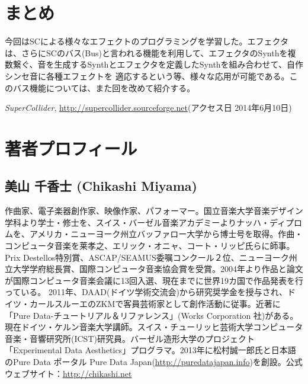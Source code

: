\documentclass{jsarticle}
\begin{document}
\section{まとめ}
今回はSCによる様々なエフェクトのプログラミングを学習した。エフェクタは、さらにSCのバス(Bus)と言われる機能を利用して、エフェクタのSynthを複数繋ぐ、音を生成するSynthとエフェクタを定義したSynthを組み合わせて、自作シンセ音に各種エフェクトを
適応するという等、様々な応用が可能である。このバス機能については、また回を改めて紹介する。


\begin{thebibliography}{citations}
   {\it SuperCollider}, \url{http://supercollider.sourceforge.net}(アクセス日 2014年6月10日)
\end{thebibliography}

\section{著者プロフィール}
\subsection{美山 千香士 (Chikashi Miyama)}
作曲家、電子楽器創作家、映像作家、パフォーマー。国立音楽大学音楽デザイン学科より学士・修士を、スイス・バーゼル音楽アカデミーよりナッハ・ディプロムを、アメリカ・ニューヨーク州立バッファロー大学から博士号を取得。作曲・コンピュータ音楽を莱孝之、エリック・オニャ、コート・リッピ氏らに師事。Prix Destellos特別賞、ASCAP/SEAMUS委嘱コンクール２位、ニューヨーク州立大学学府総長賞、国際コンピュータ音楽協会賞を受賞。2004年より作品と論文が国際コンピュータ音楽会議に13回入選、現在までに世界19カ国で作品発表を行っている。 2011年、DAAD(ドイツ学術交流会)から研究奨学金を授与され、ドイツ・カールスルーエのZKMで客員芸術家として創作活動に従事。近著に「Pure Data-チュートリアル＆リファレンス」(Works Corporation 社)がある。現在ドイツ・ケルン音楽大学講師。スイス・チューリッヒ芸術大学コンピュータ音楽・音響研究所(ICST)研究員。バーゼル造形大学のプロジェクト「Experimental Data Aesthetics」プログラマ。2013年に松村誠一郎氏と日本語のPure Data ポータル Pure Data Japan(\url{http://puredatajapan.info})を創設。公式ウェブサイト：\url{http://chikashi.net}
\end{document}
